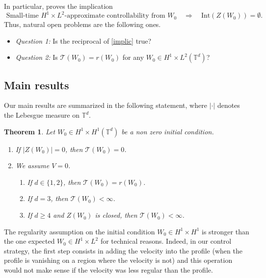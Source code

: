 \documentclass[a4paper]{article}
\theoremstyle{plain}
\newtheorem{theorem}{Theorem}
\newcommand{\T}{\mathbb{T}}
\begin{document}
In particular,  proves the implication %
\begin{equation} \label{implic}
\text{ Small-time } H^1 \times L^2\text{-approximate controllability from } W_0
\quad \Rightarrow \quad
\text{Int}\left( Z(W_0) \right) = \emptyset.
\end{equation}
Thus, natural open problems are the following ones.
\begin{itemize}[topsep=0cm, parsep=0cm, itemsep=0cm]
%
\item \emph{Question 1:} Is the reciprocal of \eqref{implic} true?
%
\item \emph{Question 2:} Is $\mathcal{T}(W_0)=r(W_0)$ for any $W_0 \in H^1 \times L^2(\T^d)$?
%
\end{itemize}







\subsection{Main results}

Our main results are summarized in the following statement, where $|\cdot|$ denotes the Lebesgue measure on $\T^d$.
\begin{theorem} \label{Main}
Let  $W_0 \in H^1 \times H^1 (\T^d)$ be a non zero initial condition.
\begin{enumerate}
    \item If $|Z(W_0)|=0$, then $\mathcal{T}(W_0)=0$.
    \item We assume $V=0$.
    \begin{enumerate}
        \item If $d \in \{1,2\}$, then $\mathcal{T}(W_0)=r(W_0)$.
        \item If $d=3$, then $\mathcal{T}(W_0)<\infty$.
        \item If $d \geq 4$ and $Z(W_0)$ is closed, then $\mathcal{T}(W_0)<\infty$.
    \end{enumerate}
\end{enumerate}
\end{theorem}

The regularity assumption on the initial condition $W_0 \in H^1\times H^1$ is stronger than the one expected $W_0 \in H^1\times L^2$ for technical reasons. Indeed, in our control strategy, the first step consists in adding the velocity into the profile (when the profile is vanishing on a region where the velocity is not) and this operation would not make sense if the velocity was less regular than the profile. 
\end{document}
